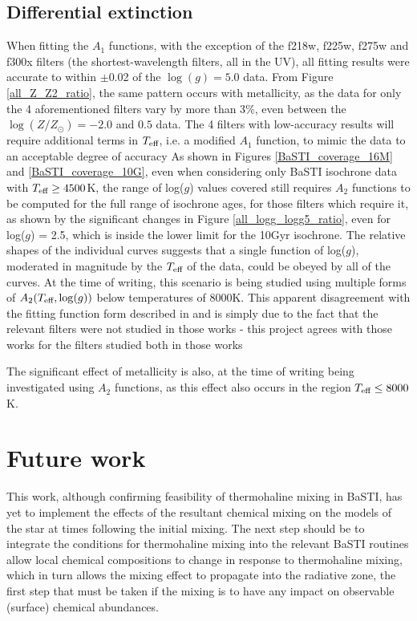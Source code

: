 \documentclass[12pt, a4paper]{report}
\begin{document}
\section{Differential extinction}
When fitting the $A_{1}$ functions, with the exception of the f218w, f225w, f275w and f300x filters (the shortest-wavelength filters, all in the UV), all fitting results were accurate to within $\pm$0.02 of the $\log(g) = 5.0$ data. From Figure \ref{all_Z_Z2_ratio}, the same pattern occurs with metallicity, as the data for only the 4 aforementioned filters vary by more than 3$\%$, even between the $\log(Z/Z_{\odot}) = -2.0$ and $0.5$ data.
The 4 filters with low-accuracy results will require additional terms in $T_{\textnormal{eff}}$, i.e. a modified  $A_{1}$ function, to mimic the data to an acceptable degree of accuracy
As shown in Figures \ref{BaSTI_coverage_16M} and \ref{BaSTI_coverage_10G}, even when considering only BaSTI isochrone data with $T_{\textnormal{eff}} \geq 4500$K, the range of log($g$) values covered still requires $A_{2}$ functions to be computed for the full range of isochrone ages, for those filters which require it, as shown by the significant changes in Figure \ref{all_logg_logg5_ratio}, even for log($g$) = 2.5, which is inside the lower limit for the 10Gyr isochrone. The relative shapes of the individual curves suggests that a single function of log($g$), moderated in magnitude by the $T_{\textnormal{eff}}$ of the data, could be obeyed by all of the curves. At the time of writing, this scenario is being studied using multiple forms of $A_{2}(T_{\textnormal{eff}},\log(g))$ below temperatures of 8000K. This apparent disagreement with the fitting function form described in \cite{2018MNRAS.475.5023C} and \cite{2018MNRAS.479L.102C} is simply due to the fact that the relevant filters were not studied in those works - this project agrees with those works for the filters studied both in those works

The significant effect of metallicity is also, at the time of writing being investigated using $A_{2}$ functions, as this effect also occurs in the region $T_{\textnormal{eff}} \leq 8000$K.

\chapter{Future work}
This work, although confirming feasibility of thermohaline mixing in BaSTI, has yet to implement the effects of the resultant chemical mixing on the models of the star at times following the initial mixing. The next step should be to integrate the conditions for thermohaline mixing into the relevant BaSTI routines allow local chemical compositions to change in response to thermohaline mixing, which in turn allows the mixing effect to propagate into the radiative zone, the first step that must be taken if the mixing is to have any impact on observable (surface) chemical abundances.
\end{document}
